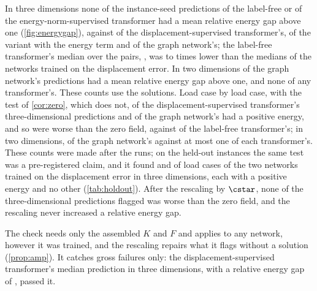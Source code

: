 In three dimensions none of the \numThreePairs{} instance-seed predictions of the label-free
or of the energy-norm-supervised transformer had a mean relative energy gap above one
(\cref{fig:energygap}), against \numThreeLabWorse{} of the displacement-supervised
transformer's, \numThreeAncWorse{} of the variant with the energy term and
\numThreeMgnWorse{} of the graph network's; the label-free transformer's median over the
pairs, \numThreeFreeGapMedian{}, was \numThreeMedianRatioMin{} to \numThreeMedianRatioMax{}
times lower than the medians of the networks trained on the displacement error. In two
dimensions \numCmMgnWorse{} of the graph network's predictions had a mean relative energy
gap above one, and none of any transformer's. These counts use the solutions. Load case by
load case, with the test of \cref{cor:zero}, which does not, \numFieldLoadWorseLab{} of the
displacement-supervised transformer's \numFieldLoads{} three-dimensional predictions and
\numFieldLoadWorseMgn{} of the graph network's had a positive energy, and so were worse than
the zero field, against \numThreeFreeLoadWorse{} of the label-free transformer's; in two
dimensions, \numSpecLoadWorseMgn{} of the graph network's \numSpecLoads{} against at most
one of each transformer's. These counts were made after the runs; on the held-out instances
the same test was a pre-registered claim, and it found \numHoldTThreeLab{} and
\numHoldTThreeMgn{} of \numHoldTThreeLoads{} load cases of the two networks trained on the
displacement error in three dimensions, each with a positive energy and no other
(\cref{tab:holdout}). After the rescaling by $\cstar$, none of the three-dimensional
predictions flagged was worse than the zero field, and the rescaling never increased a
relative energy gap.

The check needs only the assembled $K$ and $F$ and applies to any network, however it was
trained, and the rescaling repairs what it flags without a solution (\cref{prop:amp}). It
catches gross failures only: the displacement-supervised transformer's median prediction in
three dimensions, with a relative energy gap of \numThreeLabGapMedian{}, passed it.
